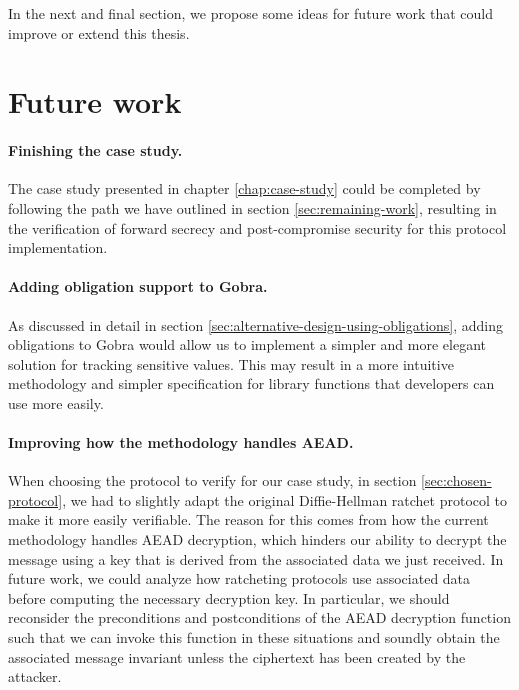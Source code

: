 In the next and final section, we propose some ideas for future work that could improve or extend this thesis.

\section{Future work}
\label{sec:future-work}

\paragraph{Finishing the case study.}
The case study presented in chapter \ref{chap:case-study} could be completed by following the path we have outlined in section \ref{sec:remaining-work}, resulting in the verification of forward secrecy and post-compromise security for this protocol implementation.

\paragraph{Adding obligation support to Gobra.}
As discussed in detail in section \ref{sec:alternative-design-using-obligations}, adding obligations to Gobra would allow us to implement a simpler and more elegant solution for tracking sensitive values.
This may result in a more intuitive methodology and simpler specification for library functions that developers can use more easily.

\paragraph{Improving how the methodology handles AEAD.}
When choosing the protocol to verify for our case study, in section \ref{sec:chosen-protocol}, we had to slightly adapt the original Diffie-Hellman ratchet protocol to make it more easily verifiable.
The reason for this comes from how the current methodology handles AEAD decryption, which hinders our ability to decrypt the message using a key that is derived from the associated data we just received.
In future work, we could analyze how ratcheting protocols use associated data before computing the necessary decryption key.
In particular, we should reconsider the preconditions and postconditions of the AEAD decryption function such that we can invoke this function in these situations and soundly obtain the associated message invariant unless the ciphertext has been created by the attacker.